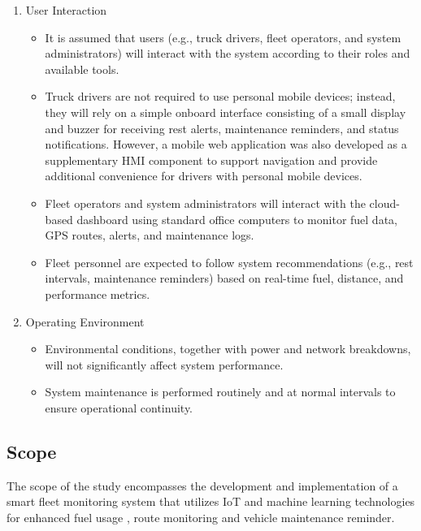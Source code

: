 \begin{enumerate}
\item User Interaction
	\begin{itemize}
		\item It is assumed that users (e.g., truck drivers, fleet operators, and system administrators) will interact with the system according to their roles and available tools.
		\item Truck drivers are not required to use personal mobile devices; instead, they will rely on a simple onboard interface consisting of a small display and buzzer for receiving rest alerts, maintenance reminders, and status notifications. However, a mobile web application was also developed as a supplementary HMI component to support navigation and provide additional convenience for drivers with personal mobile devices.
		\item Fleet operators and system administrators will interact with the cloud-based dashboard using standard office computers to monitor fuel data, GPS routes, alerts, and maintenance logs.
        \item Fleet personnel are expected to follow system recommendations (e.g., rest intervals, maintenance reminders) based on real-time fuel, distance, and performance metrics.
	\end{itemize}

\item Operating Environment
	\begin{itemize}
		\item Environmental conditions, together with power and network breakdowns, will not significantly affect system performance.
		\item System maintenance is performed routinely and at normal intervals to ensure operational continuity.
	\end{itemize}
\end{enumerate}

\subsection{Scope}
The scope of the study encompasses the development and implementation of a smart fleet monitoring system that utilizes IoT and machine learning technologies for enhanced fuel usage , route monitoring and vehicle maintenance reminder.

